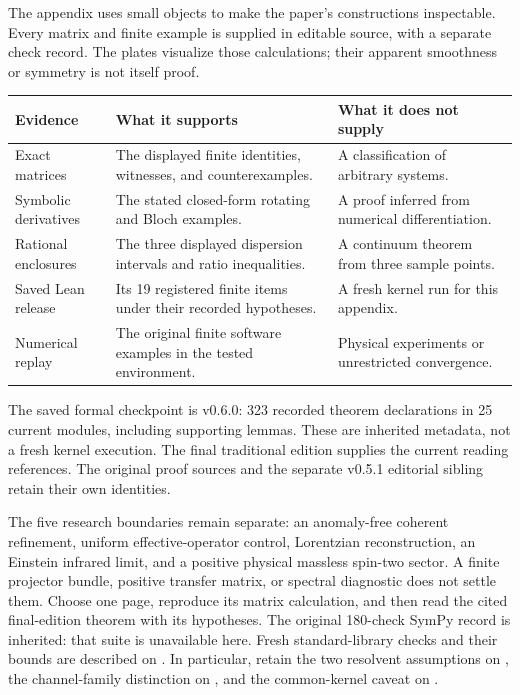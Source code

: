The appendix uses small objects to make the paper's constructions inspectable. Every matrix and finite example is supplied in editable source, with a separate check record. The plates visualize those calculations; their apparent smoothness or symmetry is not itself proof.
\par\vspace{4pt}
\begin{tabularx}{\linewidth}{@{}p{.24\linewidth}YY@{}}
\toprule
Evidence & What it supports & What it does not supply\\\midrule
Exact matrices & The displayed finite identities, witnesses, and counterexamples. & A classification of arbitrary systems.\\
Symbolic derivatives & The stated closed-form rotating and Bloch examples. & A proof inferred from numerical differentiation.\\
Rational enclosures & The three displayed dispersion intervals and ratio inequalities. & A continuum theorem from three sample points.\\
Saved Lean release & Its 19 registered finite items under their recorded hypotheses. & A fresh kernel run for this appendix.\\
Numerical replay & The original finite software examples in the tested environment. & Physical experiments or unrestricted convergence.\\\bottomrule
\end{tabularx}
The saved formal checkpoint is v0.6.0: 323 recorded theorem declarations in 25 current modules, including supporting lemmas. These are inherited metadata, not a fresh kernel execution. The final traditional edition supplies the current reading references. The original proof sources and the separate v0.5.1 editorial sibling retain their own identities.

The five research boundaries remain separate: an anomaly-free coherent refinement, uniform effective-operator control, Lorentzian reconstruction, an Einstein infrared limit, and a positive physical massless spin-two sector. A finite projector bundle, positive transfer matrix, or spectral diagnostic does not settle them.
Choose one page, reproduce its matrix calculation, and then read the cited final-edition theorem with its hypotheses. The original 180-check SymPy record is inherited: that suite is unavailable here. Fresh standard-library checks and their bounds are described on . In particular, retain the two resolvent assumptions on , the channel-family distinction on , and the common-kernel caveat on .
